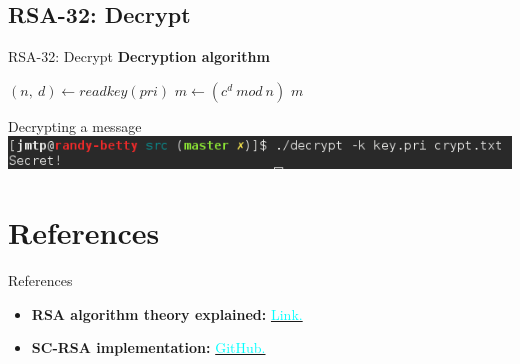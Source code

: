 \documentclass[pdf]{beamer}
\begin{document}
\subsection{RSA-32: Decrypt}
\begin{frame}{RSA-32: Decrypt}
	\textbf{Decryption algorithm}
	\begin{algorithmic}
		\State $(n,\ d)\gets readkey(pri)$
		\State $m\gets (c^d\ mod\ n)$
		\State \Return $m$
	\end{algorithmic}
	\vspace{1cm}

	\begin{block}{Decrypting a message}
		\centering
		\includegraphics[scale=0.4]{img/decrypt.png}
	\end{block}
\end{frame}

\section{References}
\begin{frame}{References}
	\begin{itemize}
		\item \textbf{RSA algorithm theory explained:}
		\href{http://www.di-mgt.com.au/rsa_alg.html}
		{\textcolor{cyan}{Link.}}
		\item \textbf{SC-RSA implementation:}
		\href{https://github.com/jmtorrespalma/sc-rsa}
		{\textcolor{cyan}{GitHub.}}
	\end{itemize}

\end{frame}
\end{document}
